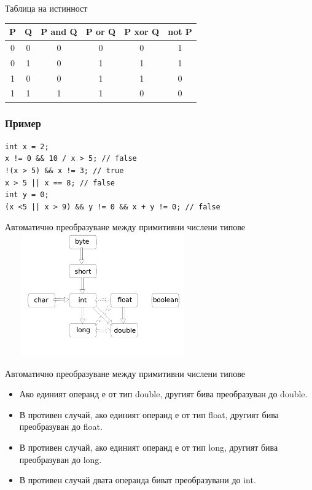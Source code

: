 \documentclass{beamer}
\begin{document}
\begin{frame}{Таблица на истинност}
  \transdissolve 
  \begin{tabular}{|c|c|c|c|c|c|}
    \hline
    P & Q & P and Q & P or Q & P xor Q & not P \\
    \hline
    0 & 0 & 0 & 0 & 0 & 1 \\
    \hline
    0 & 1 & 0 & 1 & 1 & 1 \\
    \hline
    1 & 0 & 0 & 1 & 1 & 0 \\
    \hline
    1 & 1 & 1 & 1 & 0 & 0 \\
    \hline
  \end{tabular} 
\end{frame}

\begin{frame}[fragile]
  \frametitle{Пример}
  \transdissolve
\begin{lstlisting}
int x = 2;
x != 0 && 10 / x > 5; // false
!(x > 5) && x != 3; // true
x > 5 || x == 8; // false
int y = 0;
(x <5 || x > 9) && y != 0 && x + y != 0; // false
\end{lstlisting}
\end{frame}

\begin{frame}{{Автоматично преобразуване между примитивни числени типове}}
  \transdissolve
  \includegraphics[height=200px, width=320px]{images/conversion.png}
\end{frame}

\begin{frame}{Автоматично преобразуване между примитивни числени типове}
  \transdissolve
  \begin{itemize}
    \item Ако единият операнд е от тип double, другият бива
      преобразуван до double.
    \item В противен случай, ако единият операнд е от тип float,
      другият бива преобразуван до float.
    \item В противен случай, ако единият операнд е от тип long,
      другият бива преобразуван до long.
    \item В противен случай двата операнда биват преобразувани до int.
  \end{itemize}
\end{frame}
\end{document}
